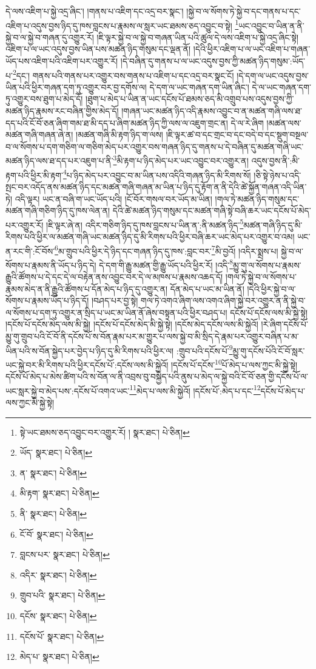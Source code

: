 དེ་ལས་འཇིག་པ་སྐྱེ་འདྲ་ཞིང་། །གནས་པ་འཇིག་དང་འདྲ་བར་སྣང་། །སྐྱེ་བ་ལ་སོགས་ཏེ་སྐྱེ་བ་དང་གནས་པ་དང་འཇིག་པ་འདུས་བྱས་ཉིད་དུ་ཁས་བླངས་པ་རྣམས་ལ་སླར་ཡང་ཐམས་ཅད་འབྱུང་བ་སྟེ། \footnote{སྟེ་ཡང་ཐམས་ཅད་འབྱུང་བར་འགྱུར་རོ། །   སྣར་ཐང་།  པེ་ཅིན། }ཡང་འབྱུང་བ་ཡིན་ན་ནི་སྐྱེ་བ་ལ་སྐྱེ་བ་གཞན་དུ་འགྱུར་རོ། །ཇི་ལྟར་སྐྱེ་བ་ལ་སྐྱེ་བ་གཞན་ཡིན་པའི་ཚུལ་དེ་ལས་འཇིག་པ་སྐྱེ་འདྲ་ཞིང་སྟེ། འཇིག་པ་ལ་ཡང་འདུས་བྱས་ཡིན་པས་མཚན་ཉིད་གསུམ་དང་ལྡན་ནོ། །དེའི་ཕྱིར་འཇིག་པ་ལ་ཡང་འཇིག་པ་གཞན་ཡོད་པས་འཇིག་པའི་འཇིག་པར་འགྱུར་རོ། །དེ་བཞིན་དུ་གནས་པ་ལ་ཡང་འདུས་བྱས་ཀྱི་མཚན་ཉིད་གསུམ་:ཡོད་པ་\footnote{ཡོད་  སྣར་ཐང་།  པེ་ཅིན། }དང་། གནས་པའི་གནས་པར་འགྱུར་བས་གནས་པ་འཇིག་པ་དང་འདྲ་བར་སྣང་ངོ། །དེ་དག་ལ་ཡང་འདུས་བྱས་ཡིན་པའི་ཕྱིར་གཞན་དག་ཏུ་འགྱུར་བར་བྱ་དགོས་ལ། དེ་དག་ལ་ཡང་གཞན་དག་ཡིན་ཞིང་། དེ་ལ་ཡང་གཞན་དག་ཏུ་འགྱུར་བས་ཐུག་པ་མེད་དོ། །ཐུག་པ་མེད་པ་ཡིན་ན་ཡང་དངོས་པོ་ཐམས་ཅད་མི་འགྲུབ་པས་འདུས་བྱས་ཀྱི་མཚན་ཉིད་རྣམས་རང་བཞིན་གྱིས་མེད་དོ། །གཞན་ཡང་མཚན་ཉིད་འདི་རྣམས་འབྱུང་བ་ན་མཚན་གཞི་ལས་ཐ་དད་པའི་ངོ་བོ་ཅན་ཞིག་གམ་ཐ་མི་དད་པ་ཞིག་མཚན་ཉིད་ཀྱི་ལས་ལ་འཇུག་གྲང་ན། དེ་ལ་རེ་ཞིག །མཚན་ལས་མཚན་གཞི་གཞན་ཞེ་ན། །མཚན་གཞི་མི་རྟག་ཉིད་ག་ལས། །ཇི་ལྟར་ཚ་བ་དང་གྲང་བ་དང་བདེ་བ་དང་སྡུག་བསྔལ་བ་ལ་སོགས་པ་དག་གཅིག་ལ་གཅིག་མེད་པར་འགྱུར་བས་གཞན་ཉིད་དུ་གནས་པ་དེ་བཞིན་དུ་མཚན་གཞི་ཡང་མཚན་ཉིད་ལས་ཐ་དད་པར་འཇུག་པ་ནི་\footnote{ན་  སྣར་ཐང་།  པེ་ཅིན། }མི་རྟག་པ་ཉིད་མེད་པར་ཡང་འབྱུང་བར་འགྱུར་ན། འདུས་བྱས་ནི་:མི་རྟག་པའི་ཕྱིར་མི་རྟག་\footnote{མི་རྟག་  སྣར་ཐང་།  པེ་ཅིན། }པ་ཉིད་མེད་པར་འབྱུང་བ་མ་ཡིན་པས་འདིའི་གཞན་ཉིད་མི་རིགས་སོ། །ཅི་སྟེ་ཉེས་པ་འདི་སྤང་བར་འདོད་ནས་མཚན་ཉིད་དང་མཚན་གཞི་གཞན་མ་ཡིན་པ་ཉིད་དུ་རྟོག་ན་ནི་དེའི་ཚེ་སྐྱོན་གཞན་འདི་ཡིན་ཏེ། འདི་ལྟར། ཡང་ན་བཞི་ག་ཡང་ཡོད་པའི། །ངོ་བོར་གསལ་བར་ཡོད་མ་ཡིན། །གལ་ཏེ་མཚན་ཉིད་གསུམ་དང་མཚན་གཞི་གཅིག་ཉིད་དུ་ཁས་ལེན་ན། དེའི་ཚེ་མཚན་ཉིད་གསུམ་དང་མཚན་གཞི་སྟེ་བཞི་ཆར་ཡང་དངོས་པོ་མེད་པར་འགྱུར་རོ། །ཇི་ལྟར་ཞེ་ན། འདིར་གཅིག་ཉིད་དུ་ཁས་བླངས་པ་ཡིན་ན་:ནི་མཚན་ཉིད་\footnote{ནི་  སྣར་ཐང་།  པེ་ཅིན། }མཚན་གཞི་ཉིད་དུ་མི་རིགས་པའི་ཕྱིར་ལ་མཚན་གཞི་ཡང་མཚན་ཉིད་དུ་མི་རིགས་པའི་ཕྱིར་བཞི་ཆར་ཡང་མེད་པར་འགྱུར་བ་འམ། ཡང་ན་རང་གི་:ངོ་བོས་\footnote{ངོ་བོ་  སྣར་ཐང་།  པེ་ཅིན། }མ་གྲུབ་པའི་ཕྱིར་དེ་ཉིད་དང་གཞན་ཉིད་དུ་ཁས་:བླང་བར་\footnote{བླངས་པར་  སྣར་ཐང་།  པེ་ཅིན། }མི་བྱའོ། །འདིར་སྨྲས་པ། སྐྱེ་བ་ལ་སོགས་པ་རྣམས་ནི་ཡོད་པ་ཉིད་དེ། དེ་དག་གི་རྒྱུ་མཚན་གྱི་རྒྱུ་ཡོད་པའི་ཕྱིར་རོ། །འདི་\footnote{འདིར་  སྣར་ཐང་།  པེ་ཅིན། }མྱུ་གུ་ལ་སོགས་པ་རྣམས་རྒྱུའི་ཚོགས་པ་དེ་དང་དེ་ལ་བརྟེན་ནས་འབྱུང་བར་དེ་ལ་མཁས་པ་རྣམས་འཆད་དོ། །གལ་ཏེ་སྐྱེ་བ་ལ་སོགས་པ་རྣམས་མེད་ན་ནི་རྒྱུའི་ཚོགས་པ་དོན་མེད་པ་ཉིད་དུ་འགྱུར་ན། དོན་མེད་པ་ཡང་མ་ཡིན་ནོ། །དེའི་ཕྱིར་སྐྱེ་བ་ལ་སོགས་པ་རྣམས་ཡོད་པ་ཉིད་དོ། །བཤད་པར་བྱ་སྟེ། གལ་ཏེ་འགའ་ཞིག་ལས་འགའ་ཞིག་སྐྱེ་བར་འགྱུར་ན་ནི་སྐྱེ་བ་ལ་སོགས་པ་དག་ཏུ་འགྱུར་ན་སྲིད་པ་ཡང་མ་ཡིན་ནོ་ཞེས་བསྟན་པའི་ཕྱིར་བཤད་པ། དངོས་པོ་དངོས་ལས་མི་སྐྱེ་སྟེ། །དངོས་པོ་དངོས་མེད་ལས་མི་སྐྱེ། །དངོས་པོ་དངོས་མེད་མི་སྐྱེ་སྟེ། །དངོས་མེད་དངོས་ལས་མི་སྐྱེའོ། །རེ་ཞིག་དངོས་པོ་མྱུ་གུ་གྲུབ་པའི་ངོ་བོ་ནི་དངོས་པོ་ས་བོན་རྣམ་པར་མ་གྱུར་པ་ལས་སྐྱེ་བ་མི་སྲིད་དེ་རྣམ་པར་འགྱུར་བཞིན་པ་མ་ཡིན་པའི་ས་བོན་སྐྱེད་པར་བྱེད་པ་ཉིད་དུ་མི་རིགས་པའི་ཕྱིར་ལ། :གྲུབ་པའི་དངོས་པོ་\footnote{གྲུབ་པའི་  སྣར་ཐང་།  པེ་ཅིན། }མྱུ་གུ་དངོས་པོའི་ངོ་བོ་སླར་ཡང་སྐྱེ་བར་མི་རིགས་པའི་ཕྱིར་དངོས་པོ་:དངོས་ལས་མི་སྐྱེའོ། །དངོས་པོ་དངོས་\footnote{དངོས་  སྣར་ཐང་།  པེ་ཅིན། }པོ་མེད་པ་ལས་ཀྱང་མི་སྐྱེ་སྟེ། དངོས་པོ་མེད་པ་མེས་ཚིག་པའི་ས་བོན་ལ་ནི་འབྲས་བུ་བསྐྱེད་པའི་ནུས་པ་མེད་ལ་སྐྱེ་བའི་ངོ་བོ་ཅན་གྱི་དངོས་པོ་ལ་ཡང་སླར་སྐྱེ་བ་མེད་པས་:དངོས་པོ་འགའ་ཡང་\footnote{དངོས་པོ་  སྣར་ཐང་།  པེ་ཅིན། }མེད་པ་ལས་མི་སྐྱེའོ། །དངོས་པོ་:མེད་པ་དང་\footnote{མེད་པ་  སྣར་ཐང་།  པེ་ཅིན། }དངོས་པོ་མེད་པ་ལས་ཀྱང་མི་སྐྱེ་སྟེ། 